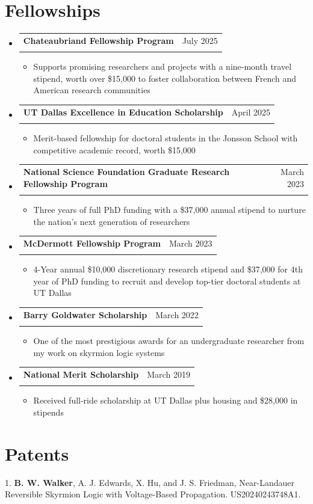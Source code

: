 \documentclass[letterpaper,11pt]{article}
\makeatletter
\newcommand{\resumeItem}[1]{
  \item\small{
    {#1 \vspace{-2pt}}
  }
}
\newcommand{\resumeSubheading}[4]{
  \vspace{-2pt}\item
    \begin{tabular*}{0.97\textwidth}[t]{l@{\extracolsep{\fill}}r}
      \textbf{#1} & #2 \\
      \textit{\small#3} & \textit{\small #4} \\
    \end{tabular*}\vspace{-7pt}
}
\newcommand{\resumeSubHeadingListStart}{\begin{itemize}[leftmargin=0.15in, label={}]}
\newcommand{\resumeSubHeadingListEnd}{\end{itemize}}
\newcommand{\resumeItemListStart}{\begin{itemize}}
\newcommand{\resumeItemListEnd}{\end{itemize}\vspace{-5pt}}
\makeatother
\begin{document}
\section{Fellowships}
\resumeSubHeadingListStart
    \resumeSubheading
    {Chateaubriand Fellowship Program}{July 2025}
    {}{}
    \vspace{-18px}
    \resumeItemListStart
      \resumeItem{Supports promising researchers and projects with a nine-month travel stipend, worth over \$15,000 to foster collaboration between French and American research communities}
    \resumeItemListEnd
    \resumeSubheading
    {UT Dallas Excellence in Education Scholarship}{April 2025}
    {}{}
    \vspace{-18px}
    \resumeItemListStart
      \resumeItem{Merit-based fellowship for doctoral students in the Jonsson School with competitive academic record, worth \$15,000}
    \resumeItemListEnd
    \vspace{-10px}
    \resumeSubheading
    {National Science Foundation Graduate Research Fellowship Program}{March 2023}
    {}{}
    \vspace{-18px}
    \resumeItemListStart
      \resumeItem{Three years of full PhD funding with a \$37,000 annual stipend to nurture the nation’s next generation of researchers}
    \resumeItemListEnd
    \resumeSubheading
    {McDermott Fellowship Program}{March 2023}
    {}{}
    \vspace{-18px}
    \resumeItemListStart
      \resumeItem{4-Year annual \$10,000 discretionary research stipend and \$37,000 for 4th year of PhD funding to recruit and develop top-tier doctoral students at UT Dallas}
    \resumeItemListEnd
    \resumeSubheading
      {Barry Goldwater Scholarship}{March 2022}
      {}{}
      \vspace{-18px}
      \resumeItemListStart
        \resumeItem{One of the most prestigious awards for an undergraduate researcher from my work on skyrmion logic systems}
      \resumeItemListEnd
    \resumeSubheading
      {National Merit Scholarship}{March 2019}
      {}{}
      \vspace{-18px}
      \resumeItemListStart
        \resumeItem{Received full-ride scholarship at UT Dallas plus housing and \$28,000 in stipends}
      \resumeItemListEnd
    \resumeSubHeadingListEnd
\vspace{-10 pt}
\section{Patents}
  \begin{itemize}[leftmargin=0.15in, label={}]
    \small{\item{
    1.\hspace{3pt} \textbf{B. W. Walker}, A. J. Edwards, X. Hu, and J. S. Friedman, Near-Landauer Reversible Skyrmion Logic with Voltage-Based Propagation. US20240243748A1.
    }}
  \end{itemize}
\end{document}
